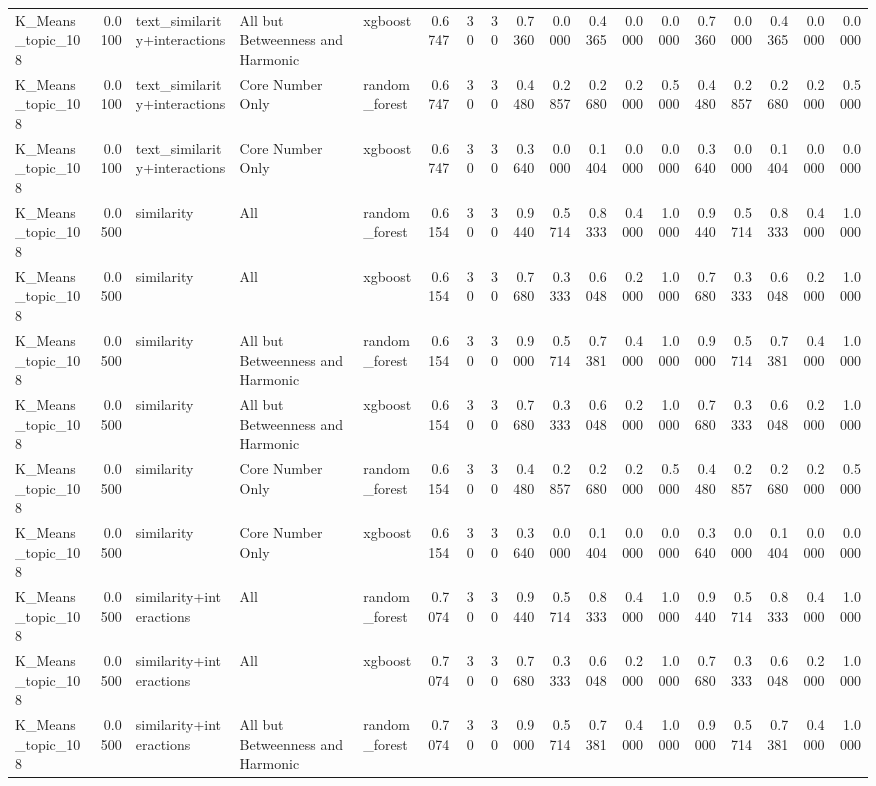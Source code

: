 \begin{tabular}{lrlllrrrrrrrrrrrrr}
K_Means_topic_108 & 0.0100 & text_similarity+interactions & All but Betweenness and Harmonic & xgboost & 0.6747 & 30 & 30 & 0.7360 & 0.0000 & 0.4365 & 0.0000 & 0.0000 & 0.7360 & 0.0000 & 0.4365 & 0.0000 & 0.0000 \\
K_Means_topic_108 & 0.0100 & text_similarity+interactions & Core Number Only & random_forest & 0.6747 & 30 & 30 & 0.4480 & 0.2857 & 0.2680 & 0.2000 & 0.5000 & 0.4480 & 0.2857 & 0.2680 & 0.2000 & 0.5000 \\
K_Means_topic_108 & 0.0100 & text_similarity+interactions & Core Number Only & xgboost & 0.6747 & 30 & 30 & 0.3640 & 0.0000 & 0.1404 & 0.0000 & 0.0000 & 0.3640 & 0.0000 & 0.1404 & 0.0000 & 0.0000 \\
K_Means_topic_108 & 0.0500 & similarity & All & random_forest & 0.6154 & 30 & 30 & 0.9440 & 0.5714 & 0.8333 & 0.4000 & 1.0000 & 0.9440 & 0.5714 & 0.8333 & 0.4000 & 1.0000 \\
K_Means_topic_108 & 0.0500 & similarity & All & xgboost & 0.6154 & 30 & 30 & 0.7680 & 0.3333 & 0.6048 & 0.2000 & 1.0000 & 0.7680 & 0.3333 & 0.6048 & 0.2000 & 1.0000 \\
K_Means_topic_108 & 0.0500 & similarity & All but Betweenness and Harmonic & random_forest & 0.6154 & 30 & 30 & 0.9000 & 0.5714 & 0.7381 & 0.4000 & 1.0000 & 0.9000 & 0.5714 & 0.7381 & 0.4000 & 1.0000 \\
K_Means_topic_108 & 0.0500 & similarity & All but Betweenness and Harmonic & xgboost & 0.6154 & 30 & 30 & 0.7680 & 0.3333 & 0.6048 & 0.2000 & 1.0000 & 0.7680 & 0.3333 & 0.6048 & 0.2000 & 1.0000 \\
K_Means_topic_108 & 0.0500 & similarity & Core Number Only & random_forest & 0.6154 & 30 & 30 & 0.4480 & 0.2857 & 0.2680 & 0.2000 & 0.5000 & 0.4480 & 0.2857 & 0.2680 & 0.2000 & 0.5000 \\
K_Means_topic_108 & 0.0500 & similarity & Core Number Only & xgboost & 0.6154 & 30 & 30 & 0.3640 & 0.0000 & 0.1404 & 0.0000 & 0.0000 & 0.3640 & 0.0000 & 0.1404 & 0.0000 & 0.0000 \\
K_Means_topic_108 & 0.0500 & similarity+interactions & All & random_forest & 0.7074 & 30 & 30 & 0.9440 & 0.5714 & 0.8333 & 0.4000 & 1.0000 & 0.9440 & 0.5714 & 0.8333 & 0.4000 & 1.0000 \\
K_Means_topic_108 & 0.0500 & similarity+interactions & All & xgboost & 0.7074 & 30 & 30 & 0.7680 & 0.3333 & 0.6048 & 0.2000 & 1.0000 & 0.7680 & 0.3333 & 0.6048 & 0.2000 & 1.0000 \\
K_Means_topic_108 & 0.0500 & similarity+interactions & All but Betweenness and Harmonic & random_forest & 0.7074 & 30 & 30 & 0.9000 & 0.5714 & 0.7381 & 0.4000 & 1.0000 & 0.9000 & 0.5714 & 0.7381 & 0.4000 & 1.0000 \\

\end{tabular}
